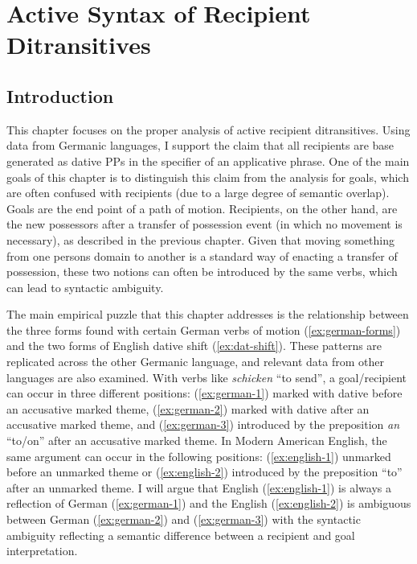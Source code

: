 \chapter{Active Syntax of Recipient Ditransitives}\label{ch:active}
\section{Introduction}
This chapter focuses on the proper analysis of active recipient ditransitives. Using data from Germanic languages, I support the claim that all recipients are base generated as dative PPs in the specifier of an applicative phrase. One of the main goals of this chapter is to distinguish this claim from the analysis for goals, which are often confused with recipients (due to a large degree of semantic overlap). Goals are the end point of a path of motion. Recipients, on the other hand, are the new possessors after a transfer of possession event (in which no movement is necessary), as described in the previous chapter. Given that moving something from one persons domain to another is a standard way of enacting a transfer of possession, these two notions can often be introduced by the same verbs, which can lead to syntactic ambiguity. 

The main empirical puzzle that this chapter addresses is the relationship between the three forms found with certain German verbs of motion (\ref{ex:german-forms}) and the two forms of English dative shift (\ref{ex:dat-shift}). These patterns are replicated across the other Germanic language, and relevant data from other languages are also examined. With verbs like \textit{schicken} ``to send'', a goal/recipient can occur in three different positions: (\ref{ex:german-1}) marked with dative before an accusative marked theme, (\ref{ex:german-2}) marked with dative after an accusative marked theme, and (\ref{ex:german-3}) introduced by the preposition \textit{an} ``to/on'' after an accusative marked theme. In Modern American English, the same argument can occur in the following positions: (\ref{ex:english-1}) unmarked before an unmarked theme or (\ref{ex:english-2}) introduced by the preposition ``to'' after an unmarked theme. I will argue that English (\ref{ex:english-1}) is always a reflection of German (\ref{ex:german-1}) and the English (\ref{ex:english-2}) is ambiguous between German (\ref{ex:german-2}) and (\ref{ex:german-3}) with the syntactic ambiguity reflecting a semantic difference between a recipient and goal interpretation.

